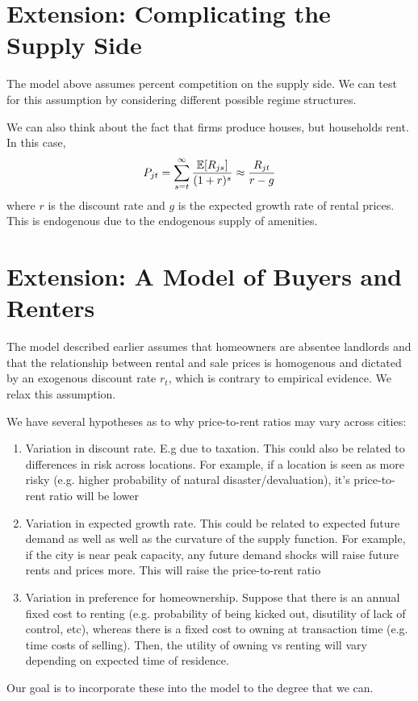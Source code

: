 \documentclass{article}
\begin{document}
\section{Extension: Complicating the Supply Side}

The model above assumes percent competition on the supply side. We can test for this assumption by considering different possible regime structures.

We can also think about the fact that firms produce houses, but households rent. In this case, 
$$P_{jt} = \sum_{s=t}^\infty \frac{\mathbb{E}[R_{js}]}{(1+r)^s} \approx \frac{R_{jt}}{r-g}$$
where $r$ is the discount rate and $g$ is the expected growth rate of rental prices. This is endogenous due to the endogenous supply of amenities.




\section{Extension: A Model of Buyers and Renters}


The model described earlier assumes that homeowners are absentee landlords and that the relationship between rental and sale prices is homogenous and dictated by an exogenous discount rate $r_t$, which is contrary to empirical evidence. We relax this assumption.

We have several hypotheses as to why price-to-rent ratios may vary across cities:
\begin{enumerate}
    \item Variation in discount rate. E.g due to taxation. This could also be related to differences in risk across locations. For example, if a location is seen as more risky (e.g. higher probability of natural disaster/devaluation), it's price-to-rent ratio will be lower
    \item Variation in expected growth rate. This could be related to expected future demand as well as well as the curvature of the supply function. For example, if the city is near peak capacity, any future demand shocks will raise future rents and prices more. This will raise the price-to-rent ratio
    \item Variation in preference for homeownership. Suppose that there is an annual fixed cost to renting (e.g. probability of being kicked out, disutility of lack of control, etc), whereas there is a fixed cost to owning at transaction time (e.g. time costs of selling). Then, the utility of owning vs renting will vary depending on expected time of residence.
\end{enumerate}
Our goal is to incorporate these into the model to the degree that we can. 
\end{document}
